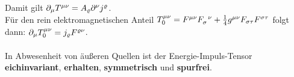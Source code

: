 Damit gilt $\partial_{\mu}T^{\mu\nu} = A_{\varrho}\partial^{\nu}j^{\varrho}$. \\
Für den rein elektromagnetischen Anteil $T^{\mu\nu}_0 = F^{\mu \nu} F_{\sigma}^{\phantom{\sigma}\nu} + \frac{1}{4}g^{\mu\nu}F_{\sigma\tau}F^{\sigma\tau}$ folgt dann: $\partial_{\mu}T^{\mu\nu}_0=j_{\varrho}F^{\varrho\nu}$. \\
\vspace{1pt} \\
In Abwesenheit von äußeren Quellen ist der Energie-Impuls-Tensor \textbf{eichinvariant}, \textbf{erhalten}, \textbf{symmetrisch} und \textbf{spurfrei}.
